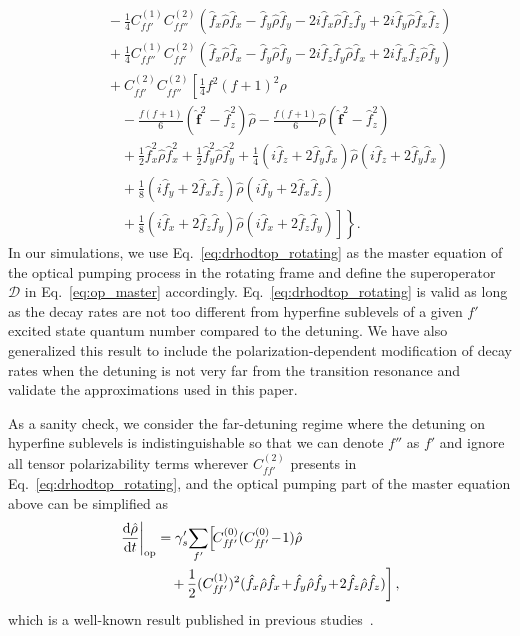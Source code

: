 \documentclass[aps,pra,twocolumn,superscriptaddress]{revtex4-1} %
\newcommand{\dt}[1]{\frac{{\mathrm d} {#1}}{{\mathrm d}t}}
\newcommand{\nn}{\nonumber}
\newcommand{\fo}{\hat{\mathbf{f}}}
\newcommand{\fx}{\hat{f}_x}
\newcommand{\fy}{\hat{f}_y}
\newcommand{\fz}{\hat{f}_z}
\newcommand{\rhoo}{\hat{\rho}}
\begin{document}
\begin{appendix}
\begin{align}
&\quad\quad -\!\frac{1}{4}C_{f\!f'}^{(1)}C_{f\!f''}^{(2)}(\fx\rhoo\fx\!-\!\fy\rhoo\fy\!-\!2i\fx\rhoo\fz\fy\!+\!2i\fy\rhoo\fx\fz )\nn\\
&\quad\quad +\!\frac{1}{4}C_{f\!f''}^{(1)}C_{f\!f'}^{(2)}(\fx\rhoo\fx\!-\!\fy\rhoo\fy\!-\!2i\fz\fy\rhoo\fx\!+\!2i\fx\fz\rhoo\fy ) \nn\\
&\quad\quad +\!C_{f\!f'}^{(2)}C_{f\!f''}^{(2)}\left[\frac{1}{4}f^2(f\!+\!1)^2\rho \right.\nn\\
&\quad\quad\quad -\!\frac{f(f\!+\!1)}{6}(\fo^2\!-\!\fz^2)\rhoo \!-\!\frac{f(f\!+\!1)}{6}\rhoo(\fo^2\!-\!\fz^2)\nn\\
&\quad\quad\quad+\!\frac{1}{2}\fx^2\rhoo\fx^2\!+\!\frac{1}{2}\fy^2\rhoo\fy^2\!+\!\frac{1}{4}(i\fz\!+\!2\fy\fx)\rhoo(i\fz\!+\!2\fy\fx)\nn\\
&\quad\quad\quad +\!\frac{1}{8}(i\fy\!+\!2\fx\fz)\rhoo(i\fy\!+\!2\fx\fz)\nn\\
&\left.\left.\quad\quad\quad+\!\frac{1}{8}(i\fx\!+\!2\fz\fy)\rhoo(i\fx\!+\!2\fz\fy) \right]\right\}.\label{eq:drhodtop_rotating}
\end{align}
In our simulations, we use Eq.~\eqref{eq:drhodtop_rotating} as the master equation of the optical pumping process in the rotating frame and define the superoperator $ \mathcal{D} $ in Eq.~\eqref{eq:op_master} accordingly. Eq.~\eqref{eq:drhodtop_rotating} is valid as long as the decay rates are not too different from hyperfine sublevels of a given $ f' $ excited state quantum number compared to the detuning. We have also generalized this result to include the polarization-dependent modification of decay rates when the detuning is not very far from the transition resonance and validate the approximations used in this paper.

As a sanity check, we consider the far-detuning regime where the detuning on hyperfine sublevels is indistinguishable so that we can denote $ f''$ as $f' $ and ignore all tensor polarizability terms wherever $ C_{ff'}^{(2)} $ presents in Eq.~\eqref{eq:drhodtop_rotating}, and the optical pumping part of the master equation above can be simplified as
\begin{align}\label{eq:op_fardetuning}
\left.\dt{\rhoo}\right|_{\rm op} &= \gamma'_s \!\sum_{f'}\! \left[\!C_{f\!f'}^{(0)}(C_{f\!f'}^{(0)}\!-\!1)\rhoo\right. \nn\\
&\quad +\! \left.\frac{1}{2}(C_{f\!f'}^{(1)})^2(\fx\rhoo\fx\!+\!\fy\rhoo\fy\!+\!2\fz\rhoo\fz ) \right],
\end{align}
which is a well-known result published in previous studies~\cite{Deutsch2010a,Baragiola2014}.


\end{appendix}
\end{document}
